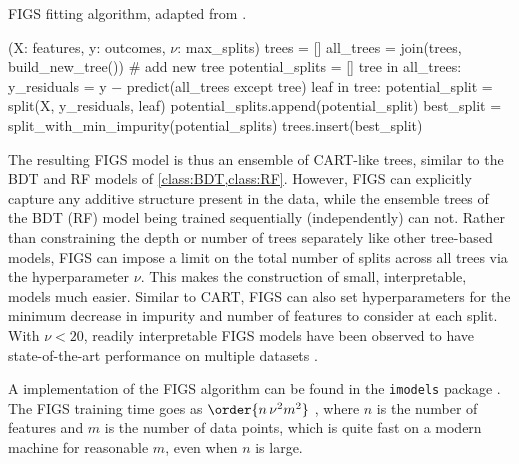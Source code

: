 \begin{algorithm}[h]
  \caption{FIGS fitting algorithm, adapted from \cite{FIGS}.}
  \label{class:FIGS:fit_algo}
  \small
\begin{algorithmic}
  (X: features, y: outcomes, $\nu$: max\_splits)
  \State trees = []
    \State all\_trees = join(trees, build\_new\_tree()) \textcolor{codegreen}{\# add new tree}
    \State potential\_splits = []
    \For{}\hspace{-3pt}tree in all\_trees:
        \State y\_residuals = y $-$ predict(all\_trees except tree)
        \For{}\hspace{-3pt}leaf in tree:
            \State potential\_split = split(X, y\_residuals, leaf)
            \State potential\_splits.append(potential\_split)
        \EndFor
    \EndFor
    \State best\_split = split\_with\_min\_impurity(potential\_splits)
    \State trees.insert(best\_split)
  \EndWhile
\end{algorithmic}
\end{algorithm}

The resulting FIGS model is thus an ensemble of CART-like trees,
similar to the BDT and RF models of \cref{class:BDT,class:RF}.
However, FIGS can explicitly capture any additive structure present in the data,
while the ensemble trees of the BDT (RF) model being trained sequentially (independently) can not.
Rather than constraining the depth or number of trees separately like other tree-based models,
FIGS can impose a limit on the total number of splits across all trees via the hyperparameter $\nu$.
This makes the construction of small, interpretable, models much easier.
Similar to CART, FIGS can also set hyperparameters for
the minimum decrease in impurity and
number of features to consider at each split.
With $\nu < 20$, readily interpretable FIGS models have been observed
to have state-of-the-art performance on multiple datasets \cite{FIGS}.

A \python implementation of the FIGS algorithm can be found in the \texttt{imodels} package \cite{imodels}.
The FIGS training time goes as $\order{n \, \nu^{2} m^{2}}$ \cite{FIGS},
where $n$ is the number of features and $m$ is the number of data points,
which is quite fast on a modern machine for reasonable $m$, even when $n$ is large.



